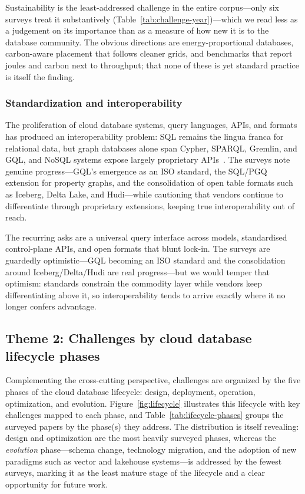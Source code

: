 \documentclass[a4paper,fleqn]{cas-sc}
\begin{document}
Sustainability is the least-addressed challenge in the entire corpus---only six surveys treat it substantively (Table~\ref{tab:challenge-year})---which we read less as a judgement on its importance than as a measure of how new it is to the database community. The obvious directions are energy-proportional databases, carbon-aware placement that follows cleaner grids, and benchmarks that report joules and carbon next to throughput; that none of these is yet standard practice is itself the finding.

\subsubsection{Standardization and interoperability}
\label{subsubsec:standardization}

The proliferation of cloud database systems, query languages, APIs, and formats has produced an interoperability problem: SQL remains the lingua franca for relational data, but graph databases alone span Cypher, SPARQL, Gremlin, and GQL, and NoSQL systems expose largely proprietary APIs~\cite{Angles2020GraphDB}. The surveys note genuine progress---GQL's emergence as an ISO standard, the SQL/PGQ extension for property graphs, and the consolidation of open table formats such as Iceberg, Delta Lake, and Hudi---while cautioning that vendors continue to differentiate through proprietary extensions, keeping true interoperability out of reach.

The recurring asks are a universal query interface across models, standardised control-plane APIs, and open formats that blunt lock-in. The surveys are guardedly optimistic---GQL becoming an ISO standard and the consolidation around Iceberg/Delta/Hudi are real progress---but we would temper that optimism: standards constrain the commodity layer while vendors keep differentiating above it, so interoperability tends to arrive exactly where it no longer confers advantage.


\subsection{Theme 2: Challenges by cloud database lifecycle phases}
\label{subsec:theme2}

Complementing the cross-cutting perspective, challenges are organized by the five phases of the cloud database lifecycle: design, deployment, operation, optimization, and evolution. Figure~\ref{fig:lifecycle} illustrates this lifecycle with key challenges mapped to each phase, and Table~\ref{tab:lifecycle-phases} groups the surveyed papers by the phase(s) they address. The distribution is itself revealing: design and optimization are the most heavily surveyed phases, whereas the \emph{evolution} phase---schema change, technology migration, and the adoption of new paradigms such as vector and lakehouse systems---is addressed by the fewest surveys, marking it as the least mature stage of the lifecycle and a clear opportunity for future work.
\end{document}
